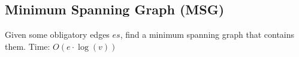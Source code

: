 \subsection{Minimum Spanning Graph (MSG)}

Given some obligatory edges $es$, find a minimum spanning graph that contains them.
Time: $O(e \cdot \log(v))$
